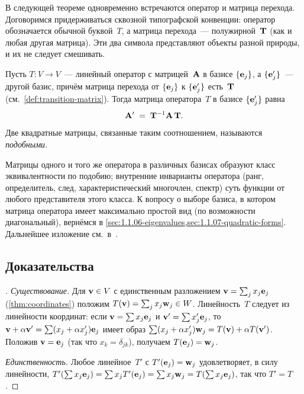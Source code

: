 \begin{remark}
\label{rem:operator-vs-transition-matrix}
В следующей теореме одновременно встречаются оператор и матрица
перехода. Договоримся придерживаться сквозной типографской
конвенции: оператор обозначается обычной буквой~$T$, а матрица
перехода~--- полужирной~$\mathbf{T}$ (как и любая другая матрица).
Эти два символа представляют объекты разной природы, и их
не следует смешивать.
\end{remark}

\begin{theorem}
\label{thm:operator-change-of-basis}
Пусть $T \colon V \to V$~--- линейный оператор с матрицей~$\mathbf{A}$ в
базисе $\{\mathbf{e}_j\}$, а $\{\mathbf{e}'_j\}$~--- другой базис, причём
матрица перехода от $\{\mathbf{e}_j\}$ к $\{\mathbf{e}'_j\}$ есть~$\mathbf{T}$
(см.\ \cref{def:transition-matrix}). Тогда матрица оператора~$T$ в
базисе $\{\mathbf{e}'_j\}$ равна
\[
  \mathbf{A}' \;=\; \mathbf{T}^{-1} \mathbf{A}\, \mathbf{T}.
\]
Две квадратные матрицы, связанные таким соотношением, называются
\emph{подобными}.
\end{theorem}

\begin{remark}
Матрицы одного и того же оператора в различных базисах образуют класс
эквивалентности по подобию; внутренние инварианты оператора (ранг,
определитель, след, характеристический многочлен, спектр) суть функции
от любого представителя этого класса. К вопросу о выборе базиса, в
котором матрица оператора имеет максимально простой вид (по
возможности диагональный), вернёмся в
\cref{sec:1.1.06-eigenvalues,sec:1.1.07-quadratic-forms}. Дальнейшее
изложение см.\ в~\cite{Beklemishev2025}.
\end{remark}

\subsection*{Доказательства}

\begin{proof}[]
\emph{Существование.} Для $\mathbf{v} \in V$ с единственным разложением
$\mathbf{v} = \sum_j x_j \mathbf{e}_j$ (\cref{thm:coordinates}) положим
$T(\mathbf{v}) = \sum_j x_j \mathbf{w}_j \in W$. Линейность~$T$ следует из
линейности координат: если $\mathbf{v} = \sum x_j \mathbf{e}_j$ и
$\mathbf{v}' = \sum x'_j \mathbf{e}_j$, то
$\mathbf{v} + \alpha \mathbf{v}' = \sum (x_j + \alpha x'_j) \mathbf{e}_j$
имеет образ
$\sum (x_j + \alpha x'_j) \mathbf{w}_j = T(\mathbf{v}) + \alpha T(\mathbf{v}')$.
Положив $\mathbf{v} = \mathbf{e}_j$ (так что $x_k = \delta_{jk}$), получаем
$T(\mathbf{e}_j) = \mathbf{w}_j$.

\emph{Единственность.} Любое линейное~$T'$ с
$T'(\mathbf{e}_j) = \mathbf{w}_j$ удовлетворяет, в силу линейности,
$T'(\sum x_j \mathbf{e}_j) = \sum x_j T'(\mathbf{e}_j) = \sum x_j \mathbf{w}_j = T(\sum x_j \mathbf{e}_j)$,
так что $T' = T$.
\end{proof}

